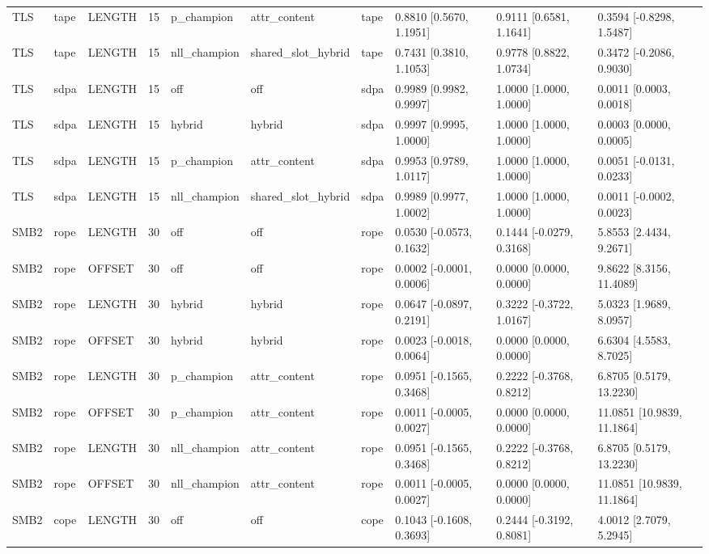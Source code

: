 \begin{tabular}{llllllllll}
TLS & tape & LENGTH & 15 & p\_champion & attr\_content & tape & 0.8810 [0.5670, 1.1951] & 0.9111 [0.6581, 1.1641] & 0.3594 [-0.8298, 1.5487] \\
TLS & tape & LENGTH & 15 & nll\_champion & shared\_slot\_hybrid & tape & 0.7431 [0.3810, 1.1053] & 0.9778 [0.8822, 1.0734] & 0.3472 [-0.2086, 0.9030] \\
TLS & sdpa & LENGTH & 15 & off & off & sdpa & 0.9989 [0.9982, 0.9997] & 1.0000 [1.0000, 1.0000] & 0.0011 [0.0003, 0.0018] \\
TLS & sdpa & LENGTH & 15 & hybrid & hybrid & sdpa & 0.9997 [0.9995, 1.0000] & 1.0000 [1.0000, 1.0000] & 0.0003 [0.0000, 0.0005] \\
TLS & sdpa & LENGTH & 15 & p\_champion & attr\_content & sdpa & 0.9953 [0.9789, 1.0117] & 1.0000 [1.0000, 1.0000] & 0.0051 [-0.0131, 0.0233] \\
TLS & sdpa & LENGTH & 15 & nll\_champion & shared\_slot\_hybrid & sdpa & 0.9989 [0.9977, 1.0002] & 1.0000 [1.0000, 1.0000] & 0.0011 [-0.0002, 0.0023] \\
SMB2 & rope & LENGTH & 30 & off & off & rope & 0.0530 [-0.0573, 0.1632] & 0.1444 [-0.0279, 0.3168] & 5.8553 [2.4434, 9.2671] \\
SMB2 & rope & OFFSET & 30 & off & off & rope & 0.0002 [-0.0001, 0.0006] & 0.0000 [0.0000, 0.0000] & 9.8622 [8.3156, 11.4089] \\
SMB2 & rope & LENGTH & 30 & hybrid & hybrid & rope & 0.0647 [-0.0897, 0.2191] & 0.3222 [-0.3722, 1.0167] & 5.0323 [1.9689, 8.0957] \\
SMB2 & rope & OFFSET & 30 & hybrid & hybrid & rope & 0.0023 [-0.0018, 0.0064] & 0.0000 [0.0000, 0.0000] & 6.6304 [4.5583, 8.7025] \\
SMB2 & rope & LENGTH & 30 & p\_champion & attr\_content & rope & 0.0951 [-0.1565, 0.3468] & 0.2222 [-0.3768, 0.8212] & 6.8705 [0.5179, 13.2230] \\
SMB2 & rope & OFFSET & 30 & p\_champion & attr\_content & rope & 0.0011 [-0.0005, 0.0027] & 0.0000 [0.0000, 0.0000] & 11.0851 [10.9839, 11.1864] \\
SMB2 & rope & LENGTH & 30 & nll\_champion & attr\_content & rope & 0.0951 [-0.1565, 0.3468] & 0.2222 [-0.3768, 0.8212] & 6.8705 [0.5179, 13.2230] \\
SMB2 & rope & OFFSET & 30 & nll\_champion & attr\_content & rope & 0.0011 [-0.0005, 0.0027] & 0.0000 [0.0000, 0.0000] & 11.0851 [10.9839, 11.1864] \\
SMB2 & cope & LENGTH & 30 & off & off & cope & 0.1043 [-0.1608, 0.3693] & 0.2444 [-0.3192, 0.8081] & 4.0012 [2.7079, 5.2945] \\

\end{tabular}
